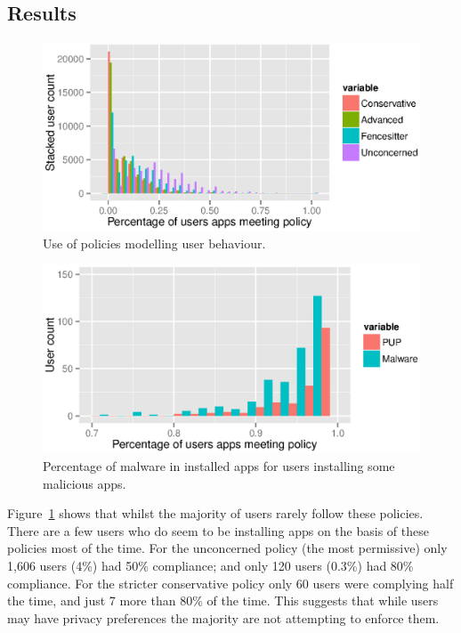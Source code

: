 \documentclass[]{soups-poster}
\begin{document}
\subsection{Results}

\begin{figure}[!ht]\centering
  \includegraphics[width=0.9\linewidth]{./tables/lin.eps}
  \caption{Use of policies modelling user behaviour.}
  \label{fig:lin}
\end{figure}

\begin{figure}[!ht]\centering
  \includegraphics[width=0.9\linewidth]{./tables/malware.eps}
  \caption{Percentage of malware in installed apps for users installing some malicious apps.}
  \label{fig:malware}
\end{figure}

Figure~\ref{fig:lin} shows that whilst the majority of users rarely follow these policies.
There are a few users who do seem to be installing apps on the basis of these policies most of the time.
For the unconcerned policy (the most permissive) only 1,606 users (4\%) had 50\% compliance;
  and only 120 users (0.3\%) had 80\% compliance.
For the stricter conservative policy only 60 users were complying half the time, and just 7 more than 80\% of the time.
This suggests that while users may have privacy preferences the majority are not attempting to enforce them.
\end{document}
